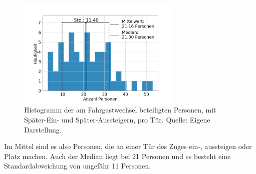 \begin{figure}[H]
	\centering
		\includegraphics[width=0.7\textwidth]{pictures/data_evaluation/data_description/hist_persons.png}
	\caption{Histogramm der am Fahrgastwechsel beteiligten Personen, mit Später-Ein- und Später-Aussteigern, pro Tür. Quelle: Eigene Darstellung.}
	\label{fig:histAllePersonen}
\end{figure}
Im Mittel sind es also  Personen, die an einer Tür des Zuges ein-, aussteigen oder Platz machen. Auch der Median liegt bei 21 Personen und es besteht eine Standardabweichung von ungefähr 11 Personen.
